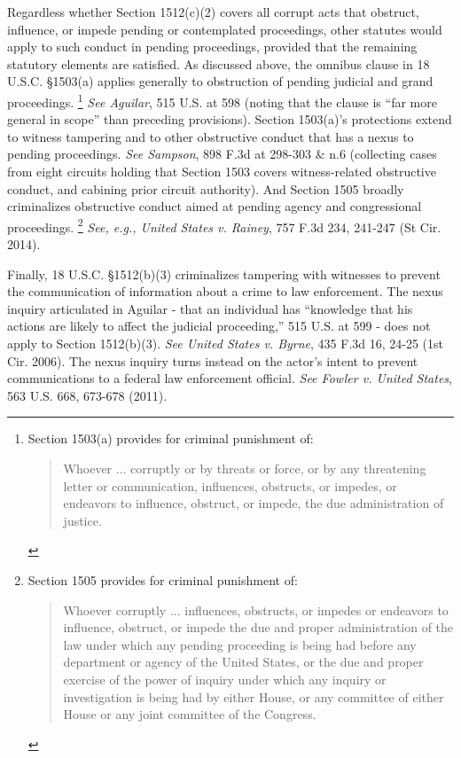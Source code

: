 Regardless whether Section 1512(c)(2) covers all corrupt acts that obstruct, influence, or impede pending or contemplated proceedings, other statutes would apply to such conduct in pending proceedings, provided that the remaining statutory elements are satisfied.
As discussed above, the omnibus clause in 18 U.S.C. \S 1503(a) applies generally to obstruction of pending judicial and grand proceedings.%
\footnote{Section 1503(a) provides for criminal punishment of:
\begin{quote}
Whoever ... corruptly or by threats or force, or by any threatening letter or communication, influences, obstructs, or impedes, or endeavors to influence, obstruct, or impede, the due administration of justice.
\end{quote}}
\textit{See Aguilar}, 515 U.S. at 598 (noting that the clause is “far more general in scope” than preceding provisions).
Section 1503(a)’s protections extend to witness tampering and to other obstructive conduct that has a nexus to pending proceedings.
\textit{See Sampson}, 898 F.3d at 298-303 \& n.6 (collecting cases from eight circuits holding that Section 1503 covers witness-related obstructive conduct, and cabining prior circuit authority).
And Section 1505 broadly criminalizes obstructive conduct aimed at pending agency and congressional proceedings.%
\footnote{Section 1505 provides for criminal punishment of:
\begin{quote}
Whoever corruptly ... influences, obstructs, or impedes or endeavors to influence, obstruct, or impede the due and proper administration of the law under which any pending proceeding is being had before any department or agency of the United States, or the due and proper exercise of the power of inquiry under which any inquiry or investigation is being had by either House, or any committee of either House or any joint committee of the Congress.
\end{quote}}
\textit{See, e.g., United States v. Rainey}, 757 F.3d 234, 241-247 (St Cir. 2014).

Finally, 18 U.S.C. \S 1512(b)(3) criminalizes tampering with witnesses to prevent the communication of information about a crime to law enforcement.
The nexus inquiry articulated in Aguilar - that an individual has “knowledge that his actions are likely to affect the judicial proceeding,” 515 U.S. at 599 - does not apply to Section 1512(b)(3).
\textit{See United States v. Byrne}, 435 F.3d 16, 24-25 (1st Cir. 2006).
The nexus inquiry turns instead on the actor’s intent to prevent communications to a federal law enforcement official.
\textit{See Fowler v. United States}, 563 U.S. 668, 673-678 (2011).

